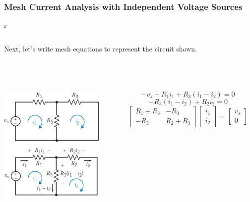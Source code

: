 \documentclass[aspectratio=169]{beamer}
\begin{document}
\begin{frame}[fragile]
	\frametitle{Mesh Current Analysis with Independent Voltage Sources}
\begin{tabular}{r}
	\begin{columns}	\column{1\textwidth}
		Next, let’s write mesh equations to represent the circuit shown.
	\end{columns} \\
	\begin{columns}
		\begin{column}{0.3\textwidth}  %
	
			\includegraphics[height=2.8cm]{figura4_55a.JPG}\\
			\includegraphics[height=2.8cm]{figura4_55c.JPG}\\

		\end{column}
		\begin{column}{0.5\textwidth}  %
			\begin{equation}
				 -v_{s}+R_{1}i_{1}+R_{3}(i_{1}-i_{2})=0
			\end{equation}		
			\begin{equation}
				- R_{3}(i_{1}-i_{2})+R_{2}i_{2}=0
			\end{equation}	
						\[ 
			\left[\begin{array}{cc}
			R_{1}+R_{3} & -R_{3} \\
			-R_{3} & R_{2}+R_{3} \end{array} \right]
			\left[\begin{array}{c}
			i_{1} \\
			 i_{2}\end{array} \right]= 
			\left[\begin{array}{c}
			v_{s} \\
			0  \end{array} \right]
			\]	
			

\end{column}
\end{columns}
\end{tabular}
\end{frame}
\end{document}

